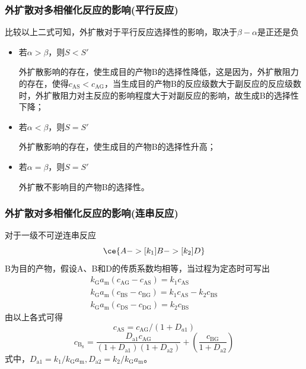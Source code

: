 \begin{frame}
    \frametitle{外扩散对多相催化反应的影响(平行反应)}

    比较以上二式可知，外扩散对于平行反应选择性的影响，取决于$\beta - \alpha$是正还是负
    \begin{itemize}
        \item 若$\alpha > \beta$，则$S < S'$
        
        外扩散影响的存在，使生成目的产物B的选择性降低，这是因为，外扩散阻力的存在，使得$c_\mathrm{AS} < c_\mathrm{AG}$，当生成目的产物B的反应级数大于副反应的反应级数时，外扩散阻力对主反应的影响程度大于对副反应的影响，故生成B的选择性下降；
        \item 若$\alpha < \beta$，则$S = S'$
        
        外扩散影响的存在，使生成目的产物B的选择性升高；
        \item 若$\alpha = \beta$，则$S = S'$
        
        外扩散不影响目的产物B的选择性。
    \end{itemize}

\end{frame}


\begin{frame}
    \frametitle{外扩散对多相催化反应的影响(连串反应)}

    对于一级不可逆连串反应
    \[
        \ce{A ->[k_1] B ->[k_2] D}
    \]
    B为目的产物，假设A、B和D的传质系数均相等，当过程为定态时可写出
    \[
        \begin{array}{l}
            k_{\mathrm{G}} a_{\mathrm{m}}\left(c_{\mathrm{AG}}-c_{\mathrm{AS}}\right)=k_{1} c_{\mathrm{AS}} \\
            k_{\mathrm{G}} a_{\mathrm{m}}\left(c_{\mathrm{BS}}-c_{\mathrm{BG}}\right)=k_{1} c_{\mathrm{AS}}-k_{2} c_{\mathrm{BS}} \\
            k_{\mathrm{G}} a_{\mathrm{m}}\left(c_{\mathrm{DS}}-c_{\mathrm{DG}}\right)=k_{2} c_{\mathrm{BS}}
            \end{array}
    \]
    由以上各式可得
    \[
        c_{\mathrm{AS}}=c_{\mathrm{AG}} /\left(1+D_{a 1}\right)
    \]
    \[
        c_{\mathrm{B}_{\mathrm{S}}}=\frac{D_{\mathrm{a} 1} c_{\mathrm{AG}}}{\left(1+D_{\mathrm{a} 1}\right)\left(1+D_{\mathrm{a} 2}\right)}+\left(\frac{c_{\mathrm{BG}}}{1+D_{\mathrm{a} 2}}\right)
    \]
    式中，$D_{\mathrm{a} 1}=k_{1} / k_{\mathrm{G}} a_{\mathrm{m}}, D_{\mathrm{a} 2}=k_{2} / k_{\mathrm{G}} a_{\mathrm{m}} $。

\end{frame}


